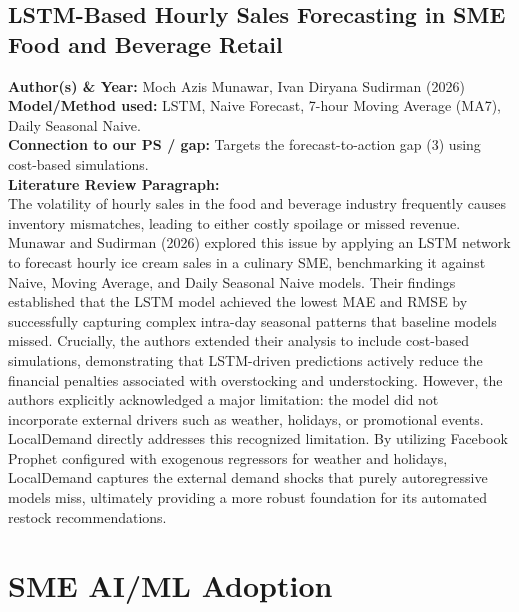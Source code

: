 \documentclass[conference]{IEEEtran}
\begin{document}
\subsection{LSTM-Based Hourly Sales Forecasting in SME Food and Beverage Retail}
\textbf{Author(s) \& Year:} Moch Azis Munawar, Ivan Diryana Sudirman (2026)\\
\textbf{Model/Method used:} LSTM, Naive Forecast, 7-hour Moving Average (MA7), Daily Seasonal Naive.\\
\textbf{Connection to our PS / gap:} Targets the forecast-to-action gap (3) using cost-based simulations.\\
\textbf{Literature Review Paragraph:}\\
The volatility of hourly sales in the food and beverage industry frequently causes inventory mismatches, leading to either costly spoilage or missed revenue. Munawar and Sudirman (2026) explored this issue by applying an LSTM network to forecast hourly ice cream sales in a culinary SME, benchmarking it against Naive, Moving Average, and Daily Seasonal Naive models. Their findings established that the LSTM model achieved the lowest MAE and RMSE by successfully capturing complex intra-day seasonal patterns that baseline models missed. Crucially, the authors extended their analysis to include cost-based simulations, demonstrating that LSTM-driven predictions actively reduce the financial penalties associated with overstocking and understocking. However, the authors explicitly acknowledged a major limitation: the model did not incorporate external drivers such as weather, holidays, or promotional events. LocalDemand directly addresses this recognized limitation. By utilizing Facebook Prophet configured with exogenous regressors for weather and holidays, LocalDemand captures the external demand shocks that purely autoregressive models miss, ultimately providing a more robust foundation for its automated restock recommendations.

\section{SME AI/ML Adoption}
\end{document}
